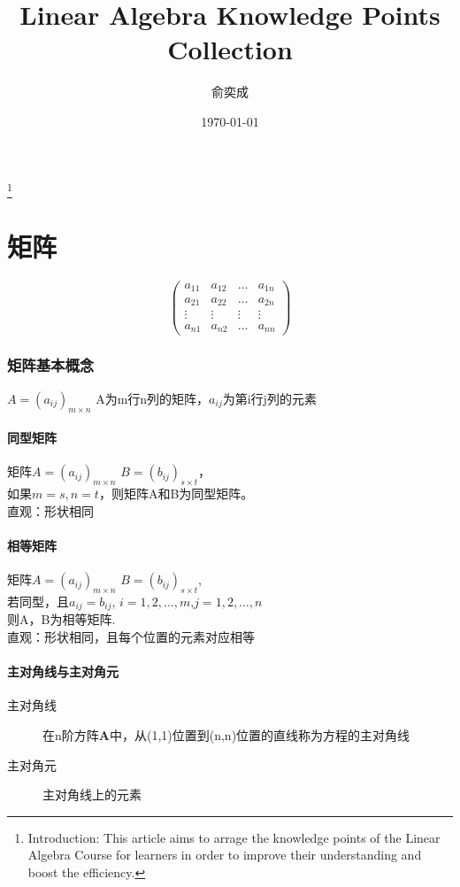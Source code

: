 \documentclass[UTF-8,a4paper]{ctexart}
\begin{document}
\title{Linear Algebra Knowledge Points Collection}
\author{\kaishu 俞奕成}
\date{\kaishu \today}
\maketitle

\thanks{Introduction: This article aims to arrage the knowledge points of the Linear Algebra Course for learners in order to improve their understanding and boost the efficiency.}
\setcounter{tocdepth}{2}
\tableofcontents

\newpage

\part{矩阵}
\[\begin{pmatrix}
    a_{11}&a_{12}&\dots&a_{1n}
    \\a_{21}&a_{22}&\dots&a_{2n}
    \\ \vdots &\vdots &\vdots &\vdots
    \\a_{n1}&a_{n2}&\dots&a_{nn}
\end{pmatrix}\]
\section{矩阵基本概念}
\(A=(a_{ij})_{m\times n}\)
A为m行n列的矩阵，\(a_{ij}\)为第i行j列的元素

\subsection{同型矩阵}
\kaishu
矩阵\(A=(a_{ij})_{m\times n}\) \(B=(b_{ij})_{s\times t}\)，\\如果\(m=s,n=t\)，则矩阵A和B为同型矩阵。
\\直观：形状相同

\subsection{相等矩阵}
\kaishu
矩阵\(A=(a_{ij})_{m\times n}\) \(B=(b_{ij})_{s\times t}\),\\
若同型，且\(a_{ij}=b_{ij}\), \(i=1,2,\dots ,m\),\(j=1,2,\dots ,n\)
\\则A，B为相等矩阵.
\\直观：形状相同，且每个位置的元素对应相等

\subsection{主对角线与主对角元}
\begin{description}
    \item[主对角线] \kaishu 在n阶方阵\(\mathbf{A}\)中，从(1,1)位置到(n,n)位置的直线称为方程的主对角线
    \item[主对角元] \kaishu 主对角线上的元素
\end{description}
\end{document}

